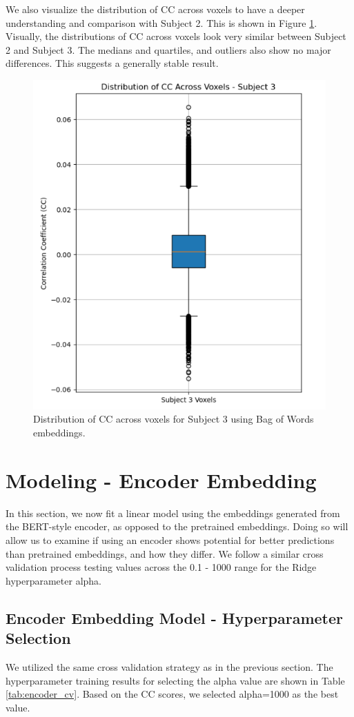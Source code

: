 \documentclass[10pt,letterpaper]{article}
\begin{document}
We also visualize the distribution of CC across voxels to have a deeper understanding and comparison with Subject 2. This is shown in Figure \ref{fig:cc_dist_voxels_subject_3}. Visually, the distributions of CC across voxels look very similar between Subject 2 and Subject 3. The medians and quartiles, and outliers also show no major differences. This suggests a generally stable result.

\begin{figure}
    \centering
    \includegraphics[width=0.5\linewidth]{figs/cc_dist_voxels_subject_3.png}
    \caption{Distribution of CC across voxels for Subject 3 using Bag of Words embeddings.}
    \label{fig:cc_dist_voxels_subject_3}
\end{figure}


\section{Modeling - Encoder Embedding}

In this section, we now fit a linear model using the embeddings generated from the BERT-style encoder, as opposed to the pretrained embeddings. Doing so will allow us to examine if using an encoder shows potential for better predictions than pretrained embeddings, and how they differ. We follow a similar cross validation process testing values across the 0.1 - 1000 range for the Ridge hyperparameter alpha.

\subsection{Encoder Embedding Model - Hyperparameter Selection}
We utilized the same cross validation strategy as in the previous section. The hyperparameter training results for selecting the alpha value are shown in Table \ref{tab:encoder_cv}. Based on the CC scores, we selected alpha=1000 as the best value.
\end{document}
